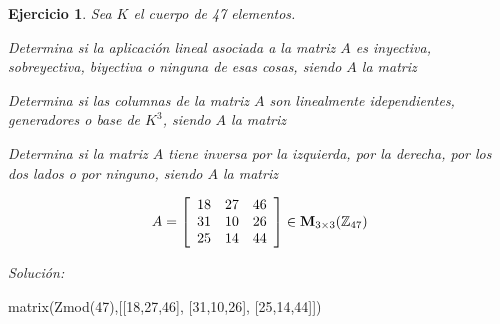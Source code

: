\documentclass[12pt]{amsart}
\newtheorem{ejer}{Ejercicio}
\begin{document}
\begin{ejer} Sea $K$ el cuerpo de 47 elementos.
\newline
\noindent\begin{minipage}{\textwidth}
\begin{tcolorbox}[colback = green!20!white,title=Versión Aplicaciones]
Determina si la aplicaci\'on lineal asociada a la matriz $A$ es inyectiva, sobreyectiva, biyectiva o ninguna de esas cosas, siendo $A$ la matriz \end{tcolorbox}
\end{minipage} \newline
\noindent\begin{minipage}{\textwidth}
\begin{tcolorbox}[colback = blue!20!white,title=Versión Vectores]
Determina si las columnas de la matriz $A$ son linealmente idependientes, generadores o base de $K^{3}$, siendo $A$ la matriz \end{tcolorbox}
\end{minipage} \newline
\noindent\begin{minipage}{\textwidth} 
\begin{tcolorbox}[colback = red!20!white,title=Versión Inversas]
Determina si la matriz $A$ tiene inversa por la izquierda, por la derecha, por los dos lados o por ninguno, siendo $A$ la matriz 
\end{tcolorbox}
\end{minipage}
\[ A = \left[\begin{array}{rrr}
18 & 27 & 46 \\
31 & 10 & 26 \\
25 & 14 & 44
\end{array}\right] \in {\bf M}_{3\times 3}({\mathbb Z}_{47})\]
\end{ejer}

{\it Soluci\'on:}

\begin{sageblock}
matrix(Zmod(47),[[18,27,46],
[31,10,26],
[25,14,44]])
\end{sageblock}

\end{document}
